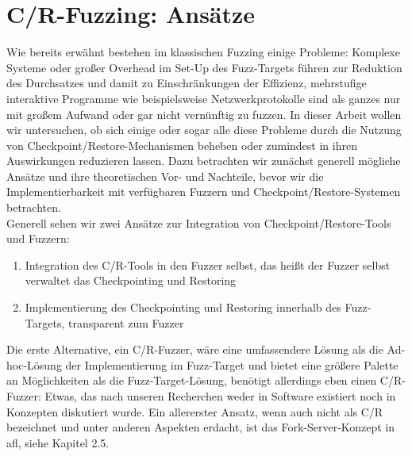 \documentclass[a4paper]{article}
\begin{document}
\section{C/R-Fuzzing: Ansätze}
Wie bereits erwähnt bestehen im klassischen Fuzzing einige Probleme: Komplexe Systeme oder großer Overhead im Set-Up des Fuzz-Targets führen zur Reduktion des Durchsatzes und damit zu Einschränkungen der Effizienz, mehrstufige interaktive Programme wie beispielsweise Netzwerkprotokolle sind als ganzes nur mit großem Aufwand oder gar nicht vernünftig zu fuzzen. 
In dieser Arbeit wollen wir untersuchen, ob sich einige oder sogar alle diese Probleme durch die Nutzung von Checkpoint/Restore-Mechanismen beheben oder zumindest in ihren Auswirkungen reduzieren lassen. 
Dazu betrachten wir zunächst generell mögliche Ansätze und ihre theoretischen Vor- und Nachteile, bevor wir die Implementierbarkeit mit verfügbaren Fuzzern und Checkpoint/Restore-Systemen betrachten.\\
Generell sehen wir zwei Ansätze zur Integration von Checkpoint/Restore-Tools und Fuzzern:
\begin{enumerate}
    \item Integration des C/R-Tools in den Fuzzer selbst, das heißt der Fuzzer selbst verwaltet das Checkpointing und Restoring
    \item Implementierung des Checkpointing und Restoring innerhalb des Fuzz-Targets, transparent zum Fuzzer
\end{enumerate}
Die erste Alternative, ein C/R-Fuzzer, wäre eine umfassendere Lösung als die Ad-hoc-Lösung der Implementierung im Fuzz-Target und bietet eine größere Palette an Möglichkeiten als die Fuzz-Target-Lösung, benötigt allerdings eben einen C/R-Fuzzer: Etwas, das nach unseren Recherchen weder in Software existiert noch in Konzepten diskutiert wurde.
Ein allererster Ansatz, wenn auch nicht als C/R bezeichnet und unter anderen Aspekten erdacht, ist das Fork-Server-Konzept in afl\cite{aflrestore}, siehe Kapitel 2.5. \\
\end{document}
